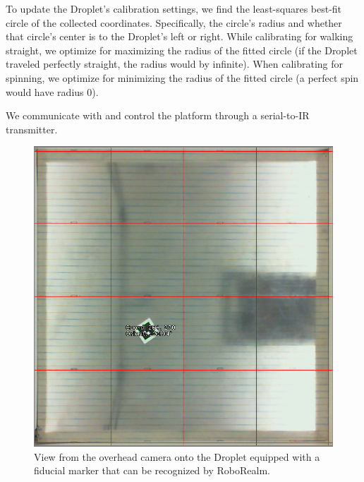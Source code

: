 \documentclass[letterpaper, 10pt, conference]{ieeeconf}
\begin{document}
To update the Droplet's calibration settings, we find the least-squares best-fit circle of the collected coordinates. Specifically, the circle's radius and whether that circle's center is to the Droplet's left or right. While calibrating for walking straight, we optimize for maximizing the radius of the fitted circle (if the Droplet traveled perfectly straight, the radius would by infinite). When calibrating for spinning, we optimize for minimizing the radius of the fitted circle (a perfect spin would have radius 0).

We communicate with and control the platform through a serial-to-IR transmitter. 

\begin{figure}[!htb]
\centering
\includegraphics[width=0.8\linewidth]{images/cameraView}
\caption{View from the overhead camera onto the Droplet equipped with a fiducial marker that can be recognized by RoboRealm.\label{fig:expsetup}} 
\end{figure}
\end{document}
